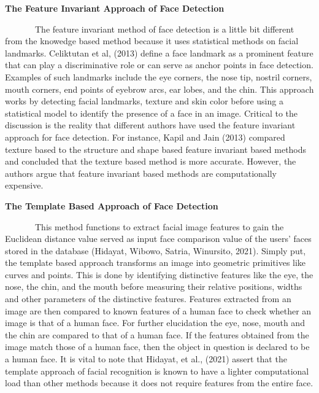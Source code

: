 \documentclass[
  12pt,
]{article}
\begin{document}
\textbf{The Feature Invariant Approach of Face Detection}\\
\vspace{-2.8em}

~~~~~~~The feature invariant method of face detection is a little bit
different from the knowedge based method because it uses statistical
methods on facial landmarks. Celiktutan et al, (2013) define a face
landmark as a prominent feature that can play a discriminative role or
can serve as anchor points in face detection. Examples of such landmarks
include the eye corners, the nose tip, nostril corners, mouth corners,
end points of eyebrow arcs, ear lobes, and the chin. This approach works
by detecting facial landmarks, texture and skin color before using a
statistical model to identify the presence of a face in an image.
Critical to the discussion is the reality that different authors have
used the feature invariant approach for face detection. For instance,
Kapil and Jain (2013) compared texture based to the structure and shape
based feature invariant based methods and concluded that the texture
based method is more accurate. However, the authors argue that feature
invariant based methods are computationally expensive.

\textbf{The Template Based Approach of Face Detection}\\
\vspace{-2.8em}

~~~~~~~This method functions to extract facial image features to gain
the Euclidean distance value served as input face comparison value of
the users' faces stored in the database (Hidayat, Wibowo, Satria,
Winursito, 2021). Simply put, the template based approach transforms an
image into geometric primitives like curves and points. This is done by
identifying distinctive features like the eye, the nose, the chin, and
the mouth before measuring their relative positions, widths and other
parameters of the distinctive features. Features extracted from an image
are then compared to known features of a human face to check whether an
image is that of a human face. For further elucidation the eye, nose,
mouth and the chin are compared to that of a human face. If the features
obtained from the image match those of a human face, then the object in
question is declared to be a human face. It is vital to note that
Hidayat, et al., (2021) assert that the template approach of facial
recognition is known to have a lighter computational load than other
methods because it does not require features from the entire face.
\end{document}
